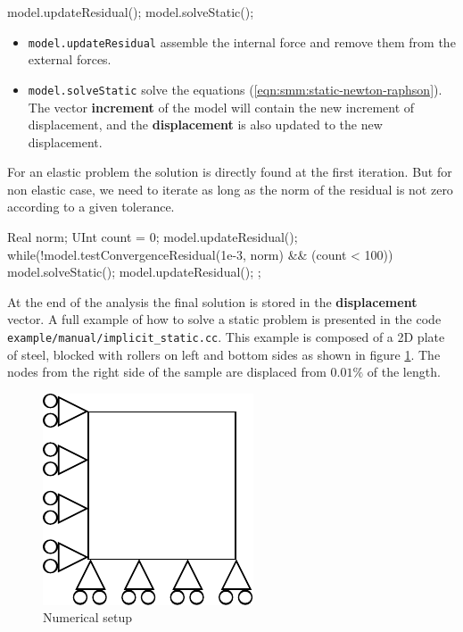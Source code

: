 \documentclass[a4paper,11pt]{book}
\newcommand{\code}[1]{\texttt{#1}}
\begin{document}
\begin{cpp}
  model.updateResidual();
  model.solveStatic();
\end{cpp}
\begin{itemize}
\item \code{model.updateResidual}  assemble the  internal force and  remove them
  from the external forces.
\item         \code{model.solveStatic}        solve         the        equations
  (\ref{eqn:smm:static-newton-raphson}).   The vector \textbf{increment}  of the
  model   will   contain   the   new   increment  of   displacement,   and   the
  \textbf{displacement} is also updated to the new displacement.
\end{itemize}

For  an   elastic  problem  the  solution   is  directly  found   at  the  first
iteration. But for non  elastic case, we need to iterate as  long as the norm of
the residual is not zero according to a given tolerance.
\begin{cpp}
  Real norm;
  UInt count = 0;
  model.updateResidual();
  while(!model.testConvergenceResidual(1e-3, norm) && (count < 100)) {
    model.solveStatic();
    model.updateResidual();
  };
\end{cpp}

At   the  end   of  the   analysis  the   final  solution   is  stored   in  the
\textbf{displacement} vector.  A  full example of how to  solve a static problem
is  presented  in   the  code  \code{example/manual/implicit\_static.cc}.   This
example is  composed of a 2D  plate of steel,  blocked with rollers on  left and
bottom sides as shown in  figure \ref{fig:smm:static}.  The nodes from the right
side of the sample are displaced from $0.01\%$ of the length.

\begin{figure}[!htb]
  \centering
  \includegraphics{figures/implicit_static}
  \caption{Numerical setup\label{fig:smm:static}}
\end{figure}
\end{document}
